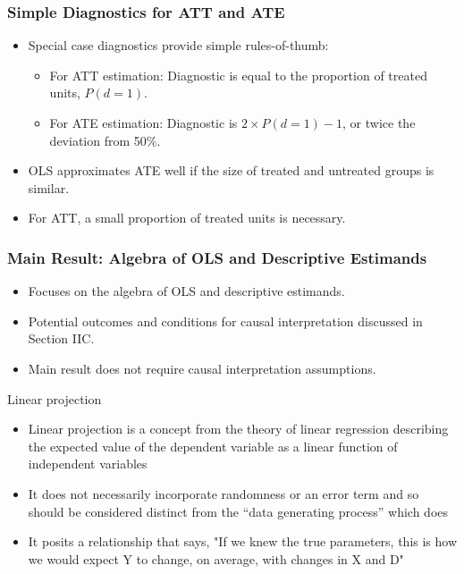 \documentclass{beamer}
\begin{document}
\begin{frame}
\frametitle{Simple Diagnostics for ATT and ATE}
\begin{itemize}
  \item Special case diagnostics provide simple rules-of-thumb:
    \begin{itemize}
      \item For ATT estimation: Diagnostic is equal to the proportion of treated units, \( P(d = 1) \).
      \item For ATE estimation: Diagnostic is \( 2 \times P(d = 1) - 1 \), or twice the deviation from 50\%.
    \end{itemize}
  \item OLS approximates ATE well if the size of treated and untreated groups is similar.
  \item For ATT, a small proportion of treated units is necessary.
\end{itemize}
\end{frame}






\begin{frame}
\frametitle{Main Result: Algebra of OLS and Descriptive Estimands}
\begin{itemize}
    \item Focuses on the algebra of OLS and descriptive estimands.
    \item Potential outcomes and conditions for causal interpretation discussed in Section IIC.
    \item Main result does not require causal interpretation assumptions.
\end{itemize}
\end{frame}

\begin{frame}{Linear projection}

\begin{itemize}
\item Linear projection is a concept from the theory of linear regression describing the expected value of the dependent variable as a linear function of independent variables 
\item It does not necessarily incorporate randomness or an error term and so should be considered distinct from the ``data generating process'' which does
\item It posits a relationship that says, "If we knew the true parameters, this is how we would expect Y to change, on average, with changes in X and D"
\end{itemize}

\end{frame}
\end{document}
